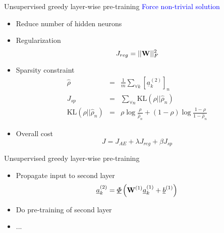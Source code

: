 	\begin{frame}[t]{Unsupervised greedy layer-wise pre-training}
	\textcolor{blue}{\Large Force non-trivial solution}		
				\begin{itemize}
				\item Reduce number of hidden neurons
				\item Regularization
					\begin{equation}
						J_{reg} = ||{\bf W}||_F^2 
					\end{equation}
				\item Sparsity constraint
					\begin{eqnarray}
						\hat{\rho} &=& \frac{1}{m} \sum_{\forall k} [\underline{a}_k^{(2)}]_n \\
						J_{sp} &=& \sum_{\forall n} \mathrm{KL}(\rho||\hat{\rho}_n) \\
						\mathrm{KL}(\rho||\hat{\rho}_n) &=& \rho \log \frac{\rho}{\hat{\rho}_n}+
(1-\rho) \log \frac{1-\rho}{1-\hat{\rho}_n}
					\end{eqnarray}
				\item Overall cost
				\begin{equation}
					J = J_{AE}+ \lambda J_{reg} + \beta J_{sp}
				\end{equation}
					
				\end{itemize}
	\end{frame}
	
		
	\begin{frame}[t]{Unsupervised greedy layer-wise pre-training}
		\begin{itemize}
				\item Propagate input to second layer
				 \begin{equation}
					\underline{a}^{(2)}_k = \underline{\Phi} \left ( {\bf W}^{(1)} \underline{a}_k^{(1)}  +
\underline{b}^{(1)} \right ) \nonumber
					\end{equation}
				\item Do pre-training of second layer
				\item ...
		\end{itemize}
		
			\begin{figure}
			\end{figure}
		
				
	\end{frame}
	
